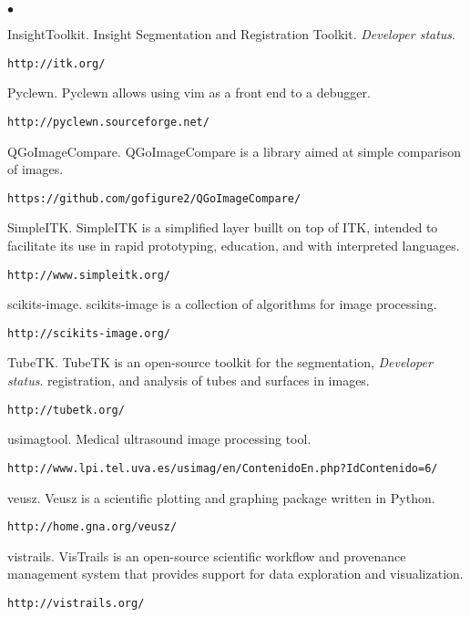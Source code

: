 \documentclass[margin,line]{res}
\newenvironment{list2}{
  \begin{list}{$\bullet$}{%
      \setlength{\itemsep}{0in}
      \setlength{\parsep}{0in} \setlength{\parskip}{0in}
      \setlength{\topsep}{0in} \setlength{\partopsep}{0in} 
      \setlength{\leftmargin}{0.2in}}}{\end{list}}
\begin{document}
\begin{resume}
\begin{list2}
\item InsightToolkit.  Insight Segmentation and Registration Toolkit.  \textit{Developer status}.
  \begin{verbatim}http://itk.org/\end{verbatim}
\item Pyclewn.  Pyclewn allows using vim as a front end to a debugger.
  \begin{verbatim}http://pyclewn.sourceforge.net/\end{verbatim}
\item QGoImageCompare.  QGoImageCompare is a library aimed at simple comparison
  of images.
  \begin{verbatim}https://github.com/gofigure2/QGoImageCompare/\end{verbatim}
\item SimpleITK.  SimpleITK is a simplified layer buillt on top of ITK, intended
  to facilitate its use in rapid prototyping, education, and with interpreted
  languages.
  \begin{verbatim}http://www.simpleitk.org/\end{verbatim}
\item scikits-image.  scikits-image is a collection of algorithms for image
  processing.
  \begin{verbatim}http://scikits-image.org/\end{verbatim}
\item TubeTK.  TubeTK is an open-source toolkit for the segmentation, \textit{Developer status}.
  registration, and analysis of tubes and surfaces in images.
  \begin{verbatim}http://tubetk.org/\end{verbatim}
\item usimagtool.  Medical ultrasound image processing tool.
  \begin{verbatim}http://www.lpi.tel.uva.es/usimag/en/ContenidoEn.php?IdContenido=6/\end{verbatim}
\item veusz.  Veusz is a scientific plotting and graphing package written in
  Python.  \begin{verbatim}http://home.gna.org/veusz/\end{verbatim}
\item vistrails.  VisTrails is an open-source scientific workflow and provenance
  management system that provides support for data exploration and visualization.
  \begin{verbatim}http://vistrails.org/\end{verbatim}

\end{list2}
\end{resume}
\end{document}
